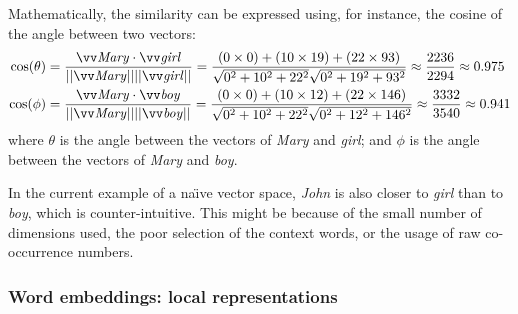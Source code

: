 Mathematically, the similarity can be expressed using, for instance, the cosine of the angle between two vectors:
%
\begin{align*}
\cos(\theta) &=
\frac{\ov{\mathit{Mary}}\cdot\ov{\mathit{girl}}}
{||\ov{\mathit{Mary}}||||\ov{\mathit{girl}}||} =
%
\frac{(0\times0) + (10\times19) + (22\times93)}
{\sqrt{0^2 + 10^2 + 22^2}\sqrt{0^2 + 19^2 + 93^2}} \approx
\frac{2236}{2294} \approx 0.975
 \\
\cos(\phi) &=
\frac{\ov{\mathit{Mary}}\cdot\ov{\mathit{boy}}}
{||\ov{\mathit{Mary}}||||\ov{\mathit{boy}}||} =
%
\frac{(0\times0) + (10\times12) + (22\times146)}
{\sqrt{0^2 + 10^2 + 22^2}\sqrt{0^2 + 12^2 + 146^2}} \approx
\frac{3332}{3540} \approx 0.941
\end{align*}
%
where $\theta$ is the angle between the vectors of \textit{Mary} and \textit{girl}; and $\phi$ is the angle between the vectors of \textit{Mary} and \textit{boy}.

In the current example of a na{\"\i}ve vector space, \textit{John} is also closer to \textit{girl} than to \textit{boy}, which is counter-intuitive. This might be because of the small number of dimensions used, the poor selection of the context words, or the usage of raw co-occurrence numbers.%

\subsubsection{Word embeddings: local representations}
\label{sec:neural-embedding}

